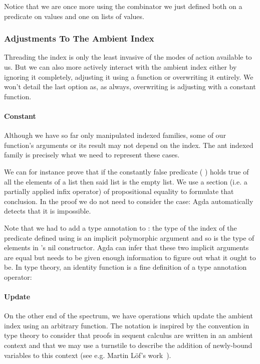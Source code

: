
Notice that we are once more using the combinator we just defined both on
a predicate on values and one on lists of values.

\subsubsection{Adjustments To The Ambient Index}\label{sec:iupdates}

Threading the index is only the least invasive of the modes of action
available to us. But we can also more actively interact with the ambient
index either by ignoring it completely, adjusting it using a function
or overwriting it entirely. We won't detail the last option as, as always,
overwriting is adjusting with a constant function.

\paragraph{Constant} Although we have so far only manipulated indexed families,
some of our function's arguments or its result may not depend on the index.
The ant indexed family is precisely what we need to represent
these cases.


We can for instance prove that if the constantly false predicate
{( )} holds true of all the elements of a list then
said list is the empty list. We use a section (i.e. a partially applied
infix operator) of propositional equality to formulate that conclusion.
In the proof we do not need to consider the  case: Agda
automatically detects that it is impossible.


Note that we had to add a type annotation to \AIC{[]}: the type of the
index of the predicate defined using  is an implicit polymorphic
argument and so is the type of elements in 's nil constructor.
Agda can infer that these two implicit arguments are equal but needs to be
given enough information to figure out what it ought to be. In type theory,
an identity function is a fine definition of a type annotation operator:


\paragraph{Update} On the other end of the spectrum, we have operations
which update the ambient index using an arbitrary function. The notation
 is inspired by the convention in type theory to consider that
proofs in sequent calculus are written in an ambient context and that we
may use a turnstile to describe the addition of newly-bound variables to
this context (see e.g. Martin L\"of's work~\cite{martin1982constructive}).

